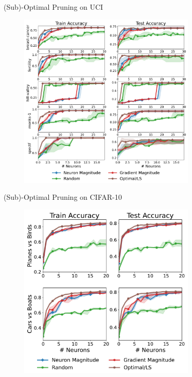 \documentclass[usenames,dvipsnames,mathserif,notheorems]{beamer}
\begin{document}
\begin{frame}{(Sub)-Optimal Pruning on UCI}
	\begin{figure}[t]
		\centering
		\includegraphics[width=0.75\textwidth]{assets/uci_pruning_full_paper.pdf}
	\end{figure}
\end{frame}

\begin{frame}{(Sub)-Optimal Pruning on CIFAR-10}
	\begin{figure}[t]
		\centering
		\includegraphics[width=0.75\textwidth]{assets/prune_cifar.pdf}
	\end{figure}
\end{frame}
\end{document}
